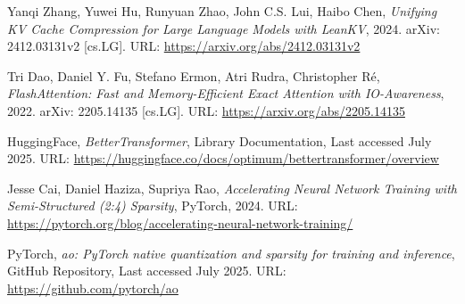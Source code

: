 \begin{thebibliography}{9}
	Yanqi Zhang, Yuwei Hu, Runyuan Zhao, John C.S. Lui, Haibo Chen,
	\textit{Unifying KV Cache Compression for Large Language Models with LeanKV},
	2024. arXiv: 2412.03131v2 [cs.LG]. URL: \url{https://arxiv.org/abs/2412.03131v2}

	Tri Dao, Daniel Y. Fu, Stefano Ermon, Atri Rudra, Christopher Ré,
	\textit{FlashAttention: Fast and Memory-Efficient Exact Attention with IO-Awareness},
	2022. arXiv: 2205.14135 [cs.LG]. URL: \url{https://arxiv.org/abs/2205.14135}

	HuggingFace,
	\textit{BetterTransformer},
	Library Documentation, Last accessed July 2025. URL: \url{https://huggingface.co/docs/optimum/bettertransformer/overview}

	Jesse Cai, Daniel Haziza, Supriya Rao,
	\textit{Accelerating Neural Network Training with Semi-Structured (2:4) Sparsity},
	PyTorch, 2024. URL: \url{https://pytorch.org/blog/accelerating-neural-network-training/}

	PyTorch,
	\textit{ao: PyTorch native quantization and sparsity for training and inference},
	GitHub Repository, Last accessed July 2025. URL: \url{https://github.com/pytorch/ao}

\end{thebibliography}